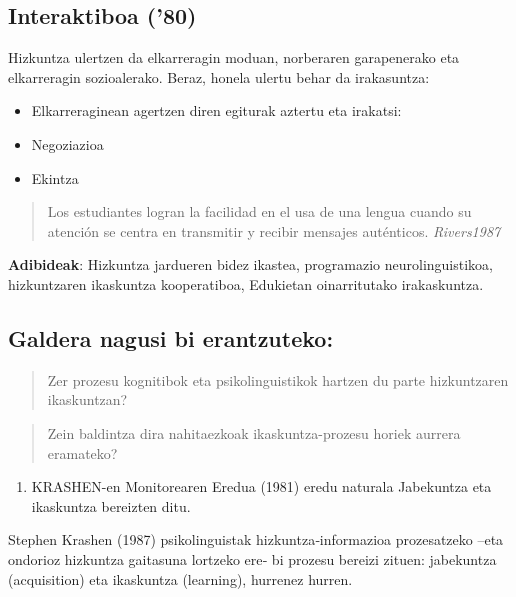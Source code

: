 \documentclass[]{book}
\providecommand{\tightlist}{%
  \setlength{\itemsep}{0pt}\setlength{\parskip}{0pt}}
\begin{document}
\hypertarget{interaktiboa-80}{%
\subsection{Interaktiboa ('80)}\label{interaktiboa-80}}

Hizkuntza ulertzen da elkarreragin moduan, norberaren garapenerako eta elkarreragin sozioalerako. Beraz, honela ulertu behar da irakasuntza:

\begin{itemize}
\tightlist
\item
  Elkarreraginean agertzen diren egiturak aztertu eta irakatsi:
\item
  Negoziazioa
\item
  Ekintza
\end{itemize}

\begin{quote}
Los estudiantes logran la facilidad en el usa de una lengua cuando su atención se centra en transmitir y recibir mensajes auténticos.
\emph{Rivers1987}
\end{quote}

\textbf{Adibideak}: Hizkuntza jardueren bidez ikastea, programazio neurolinguistikoa, hizkuntzaren ikaskuntza kooperatiboa, Edukietan oinarritutako irakaskuntza.

\hypertarget{galdera-nagusi-bi-erantzuteko}{%
\subsection{Galdera nagusi bi erantzuteko:}\label{galdera-nagusi-bi-erantzuteko}}

\begin{quote}
Zer prozesu kognitibok eta psikolinguistikok hartzen du parte hizkuntzaren ikaskuntzan?
\end{quote}

\begin{quote}
Zein baldintza dira nahitaezkoak ikaskuntza-prozesu horiek aurrera eramateko?
\end{quote}

\begin{enumerate}
\def\labelenumi{\arabic{enumi}.}
\tightlist
\item
  KRASHEN-en Monitorearen Eredua (1981) eredu naturala
  Jabekuntza eta ikaskuntza bereizten ditu.
\end{enumerate}

Stephen Krashen (1987) psikolinguistak hizkuntza‐informazioa prozesatzeko --eta ondorioz hizkuntza gaitasuna lortzeko ere‐ bi prozesu bereizi zituen: jabekuntza (acquisition) eta ikaskuntza (learning), hurrenez hurren.
\end{document}
